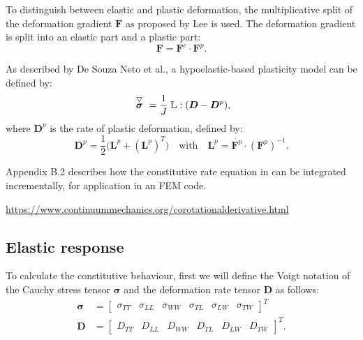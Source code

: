To distinguish between elastic and plastic deformation, the multiplicative split of the deformation gradient $\boldsymbol{F}$ as proposed by Lee \cite{Lee} is used. The deformation gradient is split into an elastic part and a plastic part:
\begin{equation}\label{Ch3_lee}
    \boldsymbol{F}=\boldsymbol{F}^e\cdot\boldsymbol{F}^p. 
\end{equation}

As described by De Souza Neto et al.\cite{compmethodsplasticity}{\color{red}{check this reference}}, a hypoelastic-based plasticity model can be defined by:
\begin{equation}\label{Ch3_objrate1}
    \acctriang{\boldsymbol{\sigma}} = \frac{1}{J}\;\boldsymbol{\mathbb L}:(\boldsymbol{D}-\boldsymbol{D}^p),
\end{equation}
where $\boldsymbol{D}^p$ is the rate of plastic deformation, defined by:
\begin{equation}
\boldsymbol{D}^p = \frac{1}{2}\Big(\boldsymbol{L}^p+(\boldsymbol{L}^p)^T\Big)\quad \text{with} \quad  \boldsymbol{L}^p=\dot{\boldsymbol{F}^p}\cdot(\boldsymbol{F}^p)^{-1}.
\end{equation}

Appendix B.2 {\color{red}{check reference}} describes how the constitutive rate equation in \label{Ch3_objrate1} can be integrated incrementally, for application in an FEM code. 





\url{https://www.continuummechanics.org/corotationalderivative.html}
\subsection{Elastic response}
To calculate the constitutive behaviour, first we will define the Voigt notation of the Cauchy stress tensor $\boldsymbol{\sigma}$ and the deformation rate tensor $\boldsymbol{D}$ as follows:
\begin{equation}
\begin{split}
\boldsymbol{\sigma}&=\begin{bmatrix}
\sigma_{TT} & \sigma_{LL} & \sigma_{WW} & \sigma_{TL} & \sigma_{LW} & \sigma_{TW}
\end{bmatrix}^T\\
\boldsymbol{D}&=\begin{bmatrix}
D_{TT} & D_{LL} & D_{WW} & D_{TL} & D_{LW} & D_{TW}
\end{bmatrix}^T.
\end{split}
\end{equation}

